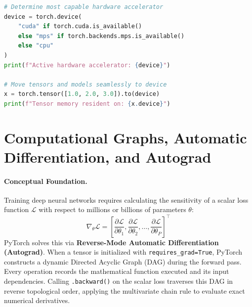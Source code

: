 \documentclass[11pt,a4paper]{article}
\begin{document}
\begin{lstlisting}[language=Python, caption={Hardware-agnostic device dispatch pattern (Cells 8--10).}, label={lst:lab01_device_dispatch}]
# Determine most capable hardware accelerator
device = torch.device(
    "cuda" if torch.cuda.is_available() 
    else "mps" if torch.backends.mps.is_available() 
    else "cpu"
)
print(f"Active hardware accelerator: {device}")

# Move tensors and models seamlessly to device
x = torch.tensor([1.0, 2.0, 3.0]).to(device)
print(f"Tensor memory resident on: {x.device}")
\end{lstlisting}

\clearpage

\section[Reverse-Mode Autograd and DAGs]{Computational Graphs, Automatic Differentiation, and Autograd}

\paragraph{Conceptual Foundation.}
Training deep neural networks requires calculating the sensitivity of a scalar loss function $\mathcal{L}$ with respect to millions or billions of parameters $\theta$:
\begin{equation}
    \nabla_\theta \mathcal{L} = \left[ \frac{\partial \mathcal{L}}{\partial \theta_1}, \frac{\partial \mathcal{L}}{\partial \theta_2}, \dots, \frac{\partial \mathcal{L}}{\partial \theta_P} \right]^\top
\end{equation}
PyTorch solves this via \textbf{Reverse-Mode Automatic Differentiation (Autograd)}. When a tensor is initialized with \texttt{requires\_grad=True}, PyTorch constructs a dynamic Directed Acyclic Graph (DAG) during the forward pass. Every operation records the mathematical function executed and its input dependencies. Calling \texttt{.backward()} on the scalar loss traverses this DAG in reverse topological order, applying the multivariate chain rule to evaluate exact numerical derivatives.
\end{document}

